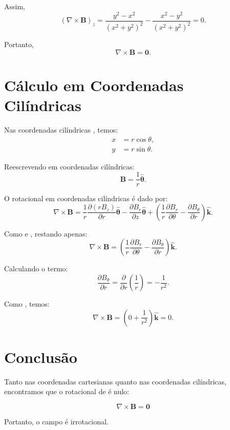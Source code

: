 \documentclass[a4paper,12pt]{article}
\begin{document}
\begin{flushleft}
Assim,
\begin{equation}
\left(\nabla \times \mathbf{B} \right)_z = \frac{y^2 - x^2}{(x^2 + y^2)^2} - \frac{x^2 - y^2}{(x^2 + y^2)^2} = 0.
\end{equation}

Portanto,
\begin{equation}
\boxed{ \nabla \times \mathbf{B} = \mathbf{0}.}
\end{equation}

\section*{Cálculo em Coordenadas Cilíndricas}

Nas coordenadas cilíndricas , temos:
\begin{align}
x &= r \cos\theta, \\
y &= r \sin\theta.
\end{align}

Reescrevendo  em coordenadas cilíndricas:
\begin{equation}
\mathbf{B} = \frac{1}{r} \hat{\bm{\theta}}.
\end{equation}

O rotacional em coordenadas cilíndricas é dado por:
\begin{equation}
\nabla \times \mathbf{B} = \frac{1}{r} \frac{\partial (r B_z)}{\partial r} \hat{\bm{\theta}} - \frac{\partial B_r}{\partial z} \hat{\bm{\theta}} + \left( \frac{1}{r} \frac{\partial B_r}{\partial \theta} - \frac{\partial B_\theta}{\partial r} \right) \hat{\mathbf{k}}.
\end{equation}

Como  e , restando apenas:
\begin{equation}
\nabla \times \mathbf{B} = \left( \frac{1}{r} \frac{\partial B_r}{\partial \theta} - \frac{\partial B_\theta}{\partial r} \right) \hat{\mathbf{k}}.
\end{equation}

Calculando o termo:
\begin{equation}
\frac{\partial B_\theta}{\partial r} = \frac{\partial}{\partial r} \left( \frac{1}{r} \right) = -\frac{1}{r^2}.
\end{equation}

Como , temos:
\begin{equation}
\nabla \times \mathbf{B} = \left( 0 + \frac{1}{r^2} \right) \hat{\mathbf{k}} = 0.
\end{equation}

\section*{Conclusão}

Tanto nas coordenadas cartesianas quanto nas coordenadas cilíndricas, encontramos que o rotacional de  é nulo:

\begin{equation}
\boxed{\nabla \times \mathbf{B} = \mathbf{0}}
\end{equation}

Portanto, o campo é irrotacional.

\end{flushleft}
    
\end{document}
